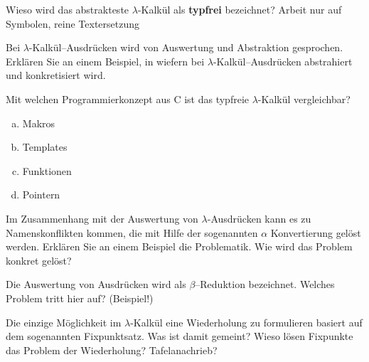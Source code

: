 \begin{card}
	Wieso wird das abstrakteste $\lambda$-Kalkül als \textbf{typfrei} bezeichnet?
	\hr
	Arbeit nur auf Symbolen, reine Textersetzung
\end{card}

\begin{card}
	Bei $\lambda$-Kalkül–Ausdrücken wird von Auswertung und Abstraktion gesprochen. Erklären Sie an einem Beispiel, in wiefern bei $\lambda$-Kalkül–Ausdrücken abstrahiert und	konkretisiert wird.
	\hr
\end{card}

\begin{card}
	Mit welchen Programmierkonzept aus C ist das typfreie $\lambda$-Kalkül vergleichbar? 
	\begin{enumerate}[a)]
	\item Makros
	\item Templates
	\item Funktionen
	\item Pointern
	\end{enumerate}
	\hr
\end{card}

\begin{card}
	Im Zusammenhang mit der Auswertung von $\lambda$-Ausdrücken kann es zu Namenskonflikten	kommen, die mit Hilfe der sogenannten
	$\alpha$
	Konvertierung gelöst werden. Erklären Sie an einem Beispiel die Problematik. Wie wird das Problem konkret gelöst?
	\hr
\end{card}

\begin{card}
	Die Auswertung von Ausdrücken wird als $\beta$–Reduktion bezeichnet. Welches Problem tritt hier auf? (Beispiel!)
	\hr
\end{card}

\begin{card}
	Die einzige Möglichkeit im $\lambda$-Kalkül eine Wiederholung zu formulieren basiert auf dem sogenannten Fixpunktsatz. Was ist damit gemeint? Wieso lösen Fixpunkte das Problem der Wiederholung? 
	\hr
	Tafelanachrieb?
\end{card}
